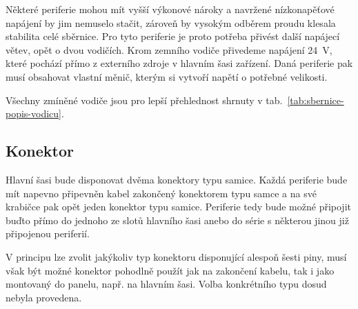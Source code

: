         Některé periferie mohou mít vyšší výkonové nároky a navržené nízkonapěťové napájení by jim nemuselo stačit, zároveň by vysokým odběrem proudu klesala stabilita celé sběrnice. Pro tyto periferie je proto potřeba přivést další napájecí větev, opět o dvou vodičích. Krom zemního vodiče přivedeme napájení \qty{24}{V}, které pochází přímo z externího zdroje v hlavním šasi zařízení. Daná periferie pak musí obsahovat vlastní měnič, kterým si vytvoří napětí o potřebné velikosti. 

        Všechny zmíněné vodiče jsou pro lepší přehlednost shrnuty v tab.~\ref{tab:sbernice-popis-vodicu}.
    
    \subsection{Konektor}
        Hlavní šasi bude disponovat dvěma konektory typu samice. Každá periferie bude mít napevno připevněn kabel zakončený konektorem typu samce a na své krabičce pak opět jeden konektor typu samice. Periferie tedy bude možné připojit buďto přímo do jednoho ze slotů hlavního šasi anebo do série s některou jinou již připojenou periferií. 

        V principu lze zvolit jakýkoliv typ konektoru disponující alespoň šesti piny, musí však být možné konektor pohodlně použít jak na zakončení kabelu, tak i jako montovaný do panelu, např. na hlavním šasi. Volba konkrétního typu dosud nebyla provedena.

